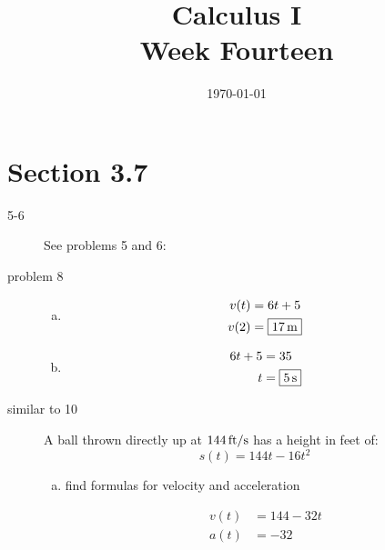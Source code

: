 \documentclass[letterpaper, landscape]{exam}
\author{}
\date{\today}
\title{Calculus I \\ Week Fourteen}
\begin{document}
  \maketitle
  \tableofcontents

  \section{Section 3.7}

  \begin{description}
    \item[5-6] See problems 5 and 6:

    \item[problem 8]
      \begin{enumerate}[(a)]
        \item 
          \begin{align*}
            v(t) & = 6t + 5 \\
            v(2) & = \boxed{ \unit[17]{m} } \\
          \end{align*}

        \item
          \begin{align*}
            6t + 5 & = 35 \\
            t      & = \boxed{ \unit[5]{s} } \\
          \end{align*}
      \end{enumerate}

    \item[similar to 10]
      A ball thrown directly up at $\unit[144]{ft/s}$ has a height in feet of:
      \[
        s(t) = 144t - 16t^2
      \]

      \begin{enumerate}[(a)]
        \item find formulas for velocity and acceleration
          \begin{solution}
            \begin{align*}
              v(t) &= 144 - 32 t \\
              a(t) &= -32 \\
            \end{align*}
          \end{solution}


\end{enumerate}
\end{description}
\end{document}
